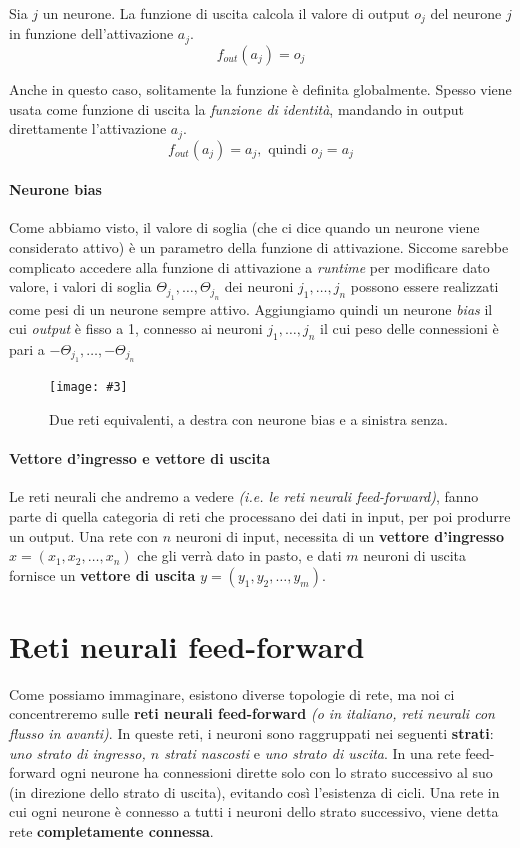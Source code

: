 \documentclass[12pt, twoside, letterpaper]{report}
\newcommand{\img}[4] {
	\begin{figure}[h]
		\caption{#1}
		\centering
		\texttt{[image: \#3]}\\
		\label{#4}
	\end{figure}
}
\begin{document}
			 	Sia $j$ un neurone. La funzione di uscita calcola il valore di output $o_j$ del neurone $j$ in funzione dell'attivazione $a_j$. $$f_{out}(a_j) = o_j$$  
			 	
			 	Anche in questo caso, solitamente la funzione è definita globalmente. Spesso viene usata come funzione di uscita la \textit{funzione di identità}, mandando in output direttamente l'attivazione $a_j$. $$f_{out}(a_j) = a_j, \text{ quindi } o_j = a_j$$
			 	
			 \paragraph{Neurone bias} Come abbiamo visto, il valore di soglia (che ci dice quando un neurone viene considerato attivo) è un parametro della funzione di attivazione. Siccome sarebbe complicato accedere alla funzione di attivazione a \textit{runtime} per modificare dato valore, i valori di soglia $\Theta_{j_1}, \dots, \Theta_{j_n}$ dei neuroni $j_1, \dots, j_n$ possono essere realizzati come pesi di un neurone sempre attivo. Aggiungiamo quindi un neurone \textit{bias} il cui \textit{output} è fisso a 1, connesso ai neuroni $j_1, \dots, j_n$ il cui peso delle connessioni è pari a $-\Theta_{j_1}, \dots, -\Theta_{j_n}$
			 
			 	\img{Due reti equivalenti, a destra con neurone bias e a sinistra senza.}{0.5}{bias-neuron.png}{bias}
			 	
			 \paragraph{Vettore d'ingresso e vettore di uscita} Le reti neurali che andremo a vedere \textit{(i.e. le reti neurali feed-forward)}, fanno parte di quella categoria di reti che processano dei dati in input, per poi produrre un output. Una rete con $n$ neuroni di input, necessita di un \textbf{vettore d'ingresso} $x = (x_1, x_2, \dots, x_n)$ che gli verrà dato in pasto, e dati $m$ neuroni di uscita fornisce un \textbf{vettore di uscita} $y = (y_1, y_2, \dots, y_m)$. 
			 
			 	 			 
		\section{Reti neurali feed-forward}
			Come possiamo immaginare, esistono diverse topologie di rete, ma noi ci concentreremo sulle \textbf{reti neurali feed-forward} \textit{(o in italiano, reti neurali con flusso in avanti)}. In queste reti, i neuroni sono raggruppati nei seguenti \textbf{strati}: \textit{uno strato di ingresso, $n$ strati nascosti} e \textit{uno strato di uscita}. In una rete feed-forward ogni neurone ha connessioni dirette solo con lo strato successivo al suo (in direzione dello strato di uscita), evitando così l'esistenza di cicli. Una rete in cui ogni neurone è connesso a tutti i neuroni dello strato successivo, viene detta rete \textbf{completamente connessa}.
			
\end{document}
